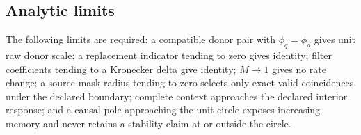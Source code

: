 \subsection{Analytic limits}

The following limits are required: a compatible donor pair with
$\phi_q=\phi_d$ gives unit raw donor scale; a replacement indicator tending
to zero gives identity; filter coefficients tending to a Kronecker delta give
identity; $M\to1$ gives no rate change; a source-mask radius tending to zero
selects only exact valid coincidences under the declared boundary; complete
context approaches the declared interior response; and a causal pole
approaching the unit circle exposes increasing memory and never retains a
stability claim at or outside the circle.

\hypertarget{rtc-core-end}{}
\begingroup
\setlength{\fboxsep}{2pt}
\noindent{}
\endgroup
